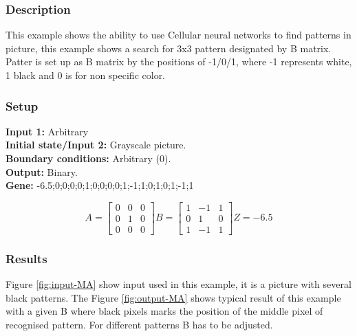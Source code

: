 \subsubsection{Description}
This example shows the ability to use Cellular neural networks to find patterns in picture, this example shows a search for 3x3  pattern designated by B matrix. 
\\ Patter is set up as B matrix by the positions of -1/0/1, where -1 represents white, 1 black and 0 is for non specific color. 
\subsubsection{Setup}

\textbf{Input 1:} Arbitrary\\
\textbf{Initial state/Input 2:} Grayscale picture.\\
\textbf{Boundary conditions:} Arbitrary (0).\\
\textbf{Output:} Binary.\\
\textbf{Gene:} -6.5;0;0;0;0;1;0;0;0;0;1;-1;1;0;1;0;1;-1;1\\

\begin{minipage}{0.9\linewidth}
\begin{equation}
A =
\begin{bmatrix}
 0 &  0 &  0 \\
  0 &  1 &  0 \\
  0 &  0 &  0
\end{bmatrix}
B =
\begin{bmatrix}
 1 & -1 & 1 \\
 0 & 1 & 0 \\
 1 & -1 & 1
\end{bmatrix}
Z = -6.5
\end{equation}
\end{minipage}
\subsubsection{Results}
Figure \ref{fig:input-MA} show input used in this example, it is a picture with several black patterns. The Figure \ref{fig:output-MA} shows typical result of this example with a given B where black pixels marks the position of the middle pixel of recognised pattern. For different patterns B has to be adjusted. \\

